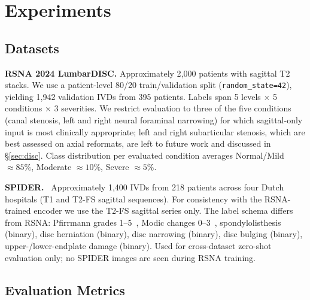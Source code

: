\documentclass[conference]{IEEEtran}
\begin{document}
\section{Experiments}
\label{sec:exp}

\subsection{Datasets}

\textbf{RSNA 2024 LumbarDISC.} Approximately 2{,}000 patients with
sagittal T2 stacks. We use a patient-level 80/20 train/validation split
(\verb|random_state=42|), yielding 1{,}942 validation IVDs from 395
patients. Labels span 5 levels $\times$ 5 conditions $\times$ 3
severities. We restrict evaluation to three of the five conditions
(canal stenosis, left and right neural foraminal narrowing) for which
sagittal-only input is most clinically appropriate; left and right
subarticular stenosis, which are best assessed on axial reformats,
are left to future work and discussed in \S\ref{sec:disc}. Class
distribution per evaluated condition averages Normal/Mild $\approx 85\%$,
Moderate $\approx 10\%$, Severe $\approx 5\%$.

\textbf{SPIDER.}~\cite{vandergraaf2024spider} Approximately 1{,}400
IVDs from 218 patients across four Dutch hospitals (T1 and T2-FS
sagittal sequences). For consistency with the RSNA-trained encoder we
use the T2-FS sagittal series only. The label schema differs from
RSNA: Pfirrmann grades 1--5~\cite{pfirrmann2001}, Modic
changes 0--3~\cite{modic1988},
spondylolisthesis (binary), disc herniation (binary), disc narrowing
(binary), disc bulging (binary), upper-/lower-endplate damage
(binary). Used for cross-dataset zero-shot evaluation only; no SPIDER
images are seen during RSNA training.

\subsection{Evaluation Metrics}
\end{document}
